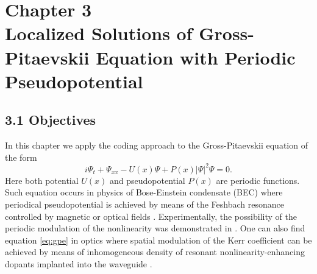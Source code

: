 \chapter*{{\normalfont Chapter 3} \\ Localized Solutions of Gross-Pitaevskii Equation with Periodic Pseudopotential}
\label{chapter:III}

\section*{3.1 Objectives}

In this chapter we apply the coding approach to the Gross-Pitaevskii equation of the form
\begin{equation}
	i \Psi_t + \Psi_{xx} - U(x) \Psi + P(x) |\Psi|^2 \Psi = 0.
\label{eq:gpe}
\end{equation}
Here both potential $U(x)$ and pseudopotential $P(x)$ are periodic functions.
Such equation occurs in physics of Bose-Einstein condensate (BEC) where periodical pseudopotential is achieved by means of the Feshbach resonance controlled by magnetic or optical fields \cite{PollackDriesJunkerChenCorcovilosHulet, ChinGrimmJulienneTsienga, BauerLetterVoRempeDurr}.
Experimentally, the possibility of the periodic modulation of the nonlinearity was demonstrated in \cite{YamazakiTaieSugawaTakahashi}.
One can also find equation \eqref{eq:gpe} in optics where spatial modulation of the Kerr coefficient can be achieved by means of inhomogeneous density of resonant nonlinearity-enhancing dopants implanted into the waveguide \cite{HukriedeRundeKip}.

